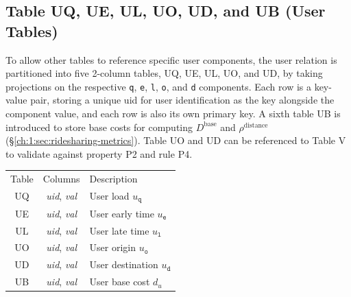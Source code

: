 \subsection{Table UQ, UE, UL, UO, UD, and UB (User Tables)}
To allow other tables to reference specific user components, the user relation
is partitioned into five 2-column tables, UQ, UE, UL, UO, and UD, by taking
projections on the respective \texttt{q}, \texttt{e}, \texttt{l}, \texttt{o},
and \texttt{d} components. Each row is a key-value pair, storing a unique
\textsf{uid} for user identification as the key alongside the component value,
and each row is also its own primary key.  A sixth table UB is introduced to
store base costs for computing $D^\textrm{base}$ and $\rho^\textrm{distance}$
(\S\ref{ch:1:sec:ridesharing-metrics}).  Table UO and UD can be referenced to Table
V to validate against property P2 and rule P4.
\begin{table}[h]
\centering
\small
\begin{tabular}{|c|c|l|}
\hline
\rowcolor{TableTitle}
\multicolumn{3}{|c|}{User Tables}\\
\hline
\rowcolor{TableHeader}
Table & Columns & Description \\
\hline
UQ & \textit{uid}, \textit{val} & User load $u_\texttt{q}$ \\
UE & \textit{uid}, \textit{val} & User early time $u_\texttt{e}$ \\
UL & \textit{uid}, \textit{val} & User late time $u_\texttt{l}$ \\
UO & \textit{uid}, \textit{val} & User origin $u_\texttt{o}$ \\
UD & \textit{uid}, \textit{val} & User destination $u_\texttt{d}$ \\
UB & \textit{uid}, \textit{val} & User base cost $d_u$ \\
\hline
\end{tabular}
\end{table}

